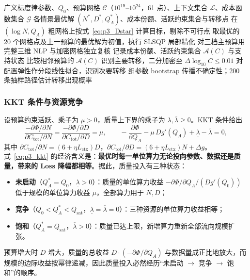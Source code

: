 \begin{algorithm}[htbp]
\caption{算力约束下的资源配置与结构转移识别}
\label{alg:p3}
\begin{algorithmic}[1]
\Require 广义标度律参数、$Q_0$、预算网格 $\mathcal C$（$10^{19}$--$10^{24}$，61 点）、上下文集合 $\mathcal L$、成本函数集合 $\mathcal G$
\Ensure 各情景最优解 $(N^*,D^*,Q_A^*)$、成本份额、活跃约束集合与转移点
    \State 在 $(\log N,Q_A)$ 粗网格上按式~\eqref{eq:p3_Dstar} 计算目标，剔除不可行点
    \State 取最优的 20 个网格点及上一预算的最优解为初值，执行 SLSQP 局部精化
    \State 对三档主预算用完整三维 NLP 与加密网格独立复核
    \State 记录成本份额、活跃约束集合 $\mathcal A(C)$ 与支持状态
  \EndFor
  \State 比较相邻预算的 $\mathcal A(C)$ 识别主要转移，二分加密至 $\Delta\log_{10}C\le0.01$
  \State 对配置弹性作分段线性拟合，识别次要转移
\EndFor
{} 组参数 bootstrap 传播不确定性；200 条抽样路径估计转移出现概率
\end{algorithmic}
\end{algorithm}

\subsubsection{KKT 条件与资源竞争}

设预算约束活跃、乘子为 $\mu>0$，质量上下界的乘子为 $\underline\lambda,\overline\lambda\ge0$。KKT 条件给出
\begin{equation}
\frac{-\partial\Phi/\partial N}{\partial C_{\mathrm{tot}}/\partial N}
=\frac{-\partial\Phi/\partial D}{\partial C_{\mathrm{tot}}/\partial D}
=\mu,\qquad
-\frac{\partial\Phi}{\partial Q_A}-\mu\,Dg'(Q_A)+\underline\lambda-\overline\lambda=0,
\label{eq:p3_kkt}
\end{equation}
其中 $\partial C_{\mathrm{tot}}/\partial N=(6+\eta L_{\mathrm{ctx}})D$，$\partial C_{\mathrm{tot}}/\partial D=(6+\eta L_{\mathrm{ctx}})N+\Delta g$。式~\eqref{eq:p3_kkt} 的经济含义是：\textbf{最优时每一单位算力无论投向参数、数据还是质量，带来的 Loss 降幅都相等}。据此，质量投入有三种状态：
\begin{itemize}
\item \textbf{未启动}（$Q_A^*=Q_0$，$\underline\lambda>0$）：质量的单位算力收益 $-\partial\Phi/\partial Q_A\big/(Dg'(Q_0))$ 低于规模的单位算力收益 $\mu$，全部算力用于 $N,D$；
\item \textbf{竞争}（$Q_0<Q_A^*<Q_{\mathrm{sat}}$，$\underline\lambda=\overline\lambda=0$）：三种资源的单位算力收益相等；
\item \textbf{饱和}（$Q_A^*=Q_{\mathrm{sat}}$，$\overline\lambda>0$）：质量已达上限，新增算力重新全部流向规模扩张。
\end{itemize}
预算增大时 $D$ 增大，质量的总收益 $D\cdot(-\partial\Phi/\partial Q_A)$ 与数据量成正比地放大，而规模的边际收益按幂律递减，因此质量投入必然经历“未启动 $\to$ 竞争 $\to$ 饱和”的顺序。

